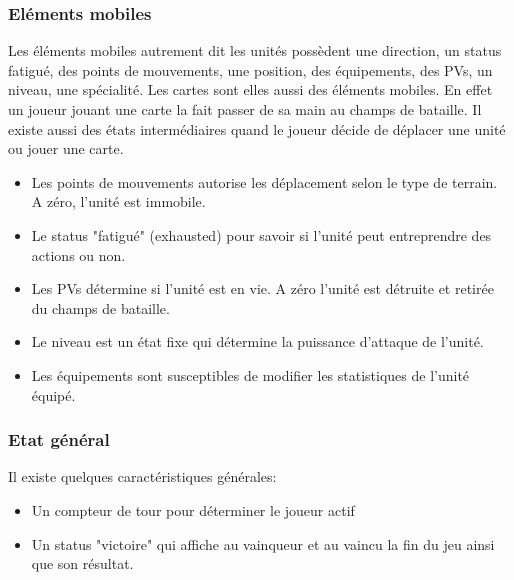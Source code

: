\newpage


\subsubsection{Eléments mobiles}
Les éléments mobiles autrement dit les unités possèdent une direction, un status fatigué, des points de mouvements, une position, des équipements, des PVs, un niveau, une spécialité. Les cartes sont elles aussi des éléments mobiles. En effet un joueur jouant une carte la fait passer de sa main au champs de bataille. \n
Il existe aussi des états intermédiaires quand le joueur décide de déplacer une unité ou jouer une carte.

\begin{itemize}
    \item Les points de mouvements autorise les déplacement selon le type de terrain. A zéro, l'unité est immobile.
    \item Le status "fatigué" (exhausted) pour savoir si l'unité peut entreprendre des actions ou non.
    \item Les PVs détermine si l'unité est en vie. A zéro l'unité est détruite et retirée du champs de bataille. 
    \item Le niveau est un état fixe qui détermine la puissance d'attaque de l'unité.
    \item Les équipements sont susceptibles de modifier les statistiques de l'unité équipé.
    
\end{itemize}


\subsubsection{Etat général}

Il existe quelques caractéristiques générales:

\begin{itemize}
    \item Un compteur de tour pour déterminer le joueur actif
    \item Un status "victoire" qui affiche au vainqueur et au vaincu la fin du jeu ainsi que son résultat.
\end{itemize}


